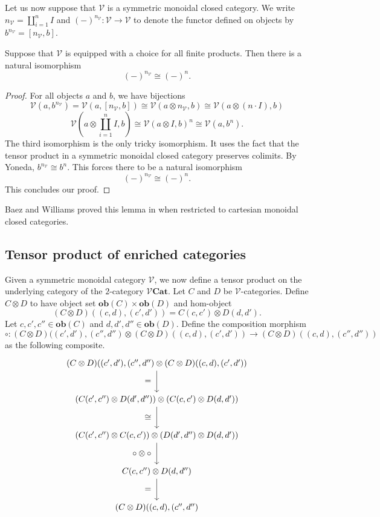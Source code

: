 \documentclass{tac}
\begin{document}
Let us now suppose that $\mathcal{V}$ is a symmetric monoidal closed category. We write $n_\mathcal{V}=\coprod_{i=1}^nI$ and $(-)^{n_{\mathcal{V}}}:\mathcal{V}\to\mathcal{V}$ to denote the functor defined on objects by $b^{n_\mathcal{V}}=[n_\mathcal{V},b]$.

\begin{lemma}\label{ind_fun_iso_to_prod}
Suppose that $\mathcal{V}$ is equipped with a choice for all finite products. Then there is a natural isomorphism 
\[
(-)^{n_\mathcal{V}}\cong (-)^n.
\]
\end{lemma}

\begin{proof}
For all objects $a$ and $b$, we have bijections
\[
\mathcal{V}(a,b^{n_\mathcal{V}})=\mathcal{V}(a,[n_\mathcal{V},b])\cong \mathcal{V}(a\otimes n_\mathcal{V},b)\cong \mathcal{V}(a\otimes (n\cdot I),b)
\]
\[
\mathcal{V}(a\otimes \coprod_{i=1}^nI,b)\cong \mathcal{V}(a\otimes I,b)^n\cong\mathcal{V}(a,b^n).
\]
The third isomorphism is the only tricky isomorphism. It uses the fact that the tensor product in a symmetric monoidal closed category preserves colimits. 
By Yoneda, $b^{n_{\mathcal{V}}}\cong b^n$. This forces there to be a natural isomorphism 
\[
(-)^{n_\mathcal{V}}\cong (-)^n.
\]
This concludes our proof.
\end{proof}

Baez and Williams proved this lemma in \cite{BaezWilliams2020} when restricted to cartesian monoidal closed categories.

\subsection*{Tensor product of enriched categories}
Given a symmetric monoidal category $\mathcal{V}$, we now define a tensor product on the underlying category of the $2$-category $\mathcal{V}\mathbf{Cat}$. Let $C$ and $D$ be $\mathcal{V}$-categories. Define $C\otimes D$ to have object set $\mathbf{ob}(C)\times\mathbf{ob}(D)$ and hom-object 
\[
(C\otimes D)((c,d),(c',d'))=C(c,c')\otimes D(d,d').
\]
Let $c,c',c''\in\mathbf{ob}(C)$ and $d,d',d''\in\mathbf{ob}(D)$. Define the composition morphism 
\[
\circ:(C\otimes D)((c',d'),(c'',d'')\otimes (C\otimes D)((c,d),(c',d'))\to (C\otimes D)((c,d),(c'',d''))
\]
as the following composite.
\[
\begin{tikzpicture}[node distance=1.5cm]
    \node (A) {$(C\otimes D)((c',d'),(c'',d'')\otimes (C\otimes D)((c,d),(c',d'))$};
    \node (B)[below of=A] {$(C(c',c'')\otimes D(d',d''))\otimes(C(c,c')\otimes D(d,d'))$};
    \node (C) [below of=B]{$(C(c',c'')\otimes C(c,c'))\otimes (D(d',d'')\otimes D(d,d'))$};
    \node (D)[below of=C]{$C(c,c'')\otimes D(d,d'')$};
    \node (E)[below of=D]{$(C\otimes D)((c,d),(c'',d'')$};
    \draw[->] (A) to node[left=3]{$=$}(B);
    \draw[->] (B) to node[left=3]{$\cong$}(C);
    \draw[->] (C) to node[left=3]{$\circ\otimes\circ$}(D);
    \draw[->] (D) to node[left=3]{$=$}(E);
\end{tikzpicture}
\]
\end{document}
